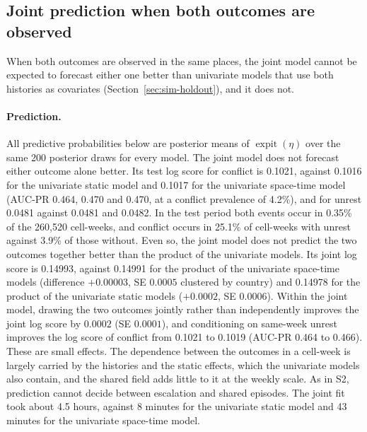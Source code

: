 \subsection{Joint prediction when both outcomes are observed}\label{supp:app-jointpred}

When both outcomes are observed in the same places, the joint model cannot be expected
to forecast either one better than univariate models that use both histories as
covariates (Section~\ref{sec:sim-holdout}), and it does not.

\paragraph{Prediction.} All predictive probabilities below are posterior means of
$\operatorname{expit}(\eta)$ over the same 200 posterior draws for every model. The joint model does not
forecast either outcome alone better. Its test log score for conflict is 0.1021,
against 0.1016 for the univariate static model and 0.1017 for the univariate
space-time model (AUC-PR 0.464, 0.470 and 0.470, at a conflict prevalence of 4.2\%),
and for unrest 0.0481 against 0.0481 and 0.0482. In the test period both events occur
in 0.35\% of the 260{,}520 cell-weeks, and conflict occurs in 25.1\% of cell-weeks
with unrest against 3.9\% of those without. Even so, the joint model does not predict the two
outcomes together better than the product of the univariate models. Its joint log score is 0.14993, against 0.14991 for the
product of the univariate space-time models (difference $+0.00003$, SE $0.0005$
clustered by country) and 0.14978 for the product of the univariate static models
($+0.0002$, SE $0.0006$). Within the joint model, drawing the two outcomes jointly
rather than independently improves the joint log score by $0.0002$ (SE $0.0001$), and
conditioning on same-week unrest improves the log score of conflict from 0.1021 to
0.1019 (AUC-PR 0.464 to 0.466). These are small effects. The dependence between the
outcomes in a cell-week is largely carried by the histories and the static effects,
which the univariate models also contain, and the shared field adds little to it at the
weekly scale. As in S2, prediction cannot decide between escalation and shared episodes. The joint fit took about 4.5 hours,
against 8 minutes for the univariate static model and 43 minutes for the univariate space-time model.

